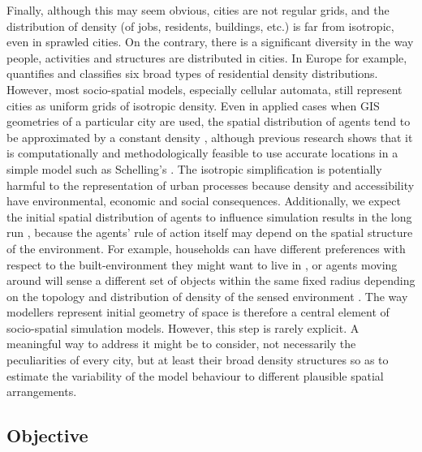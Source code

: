 \documentclass{JASSS}
\begin{document}
Finally, although this may seem obvious, cities are not regular grids, and the distribution of density (of jobs, residents, buildings, etc.) is far from isotropic, even in sprawled cities. On the contrary, there is a significant diversity in the way people, activities and structures are distributed in cities. In Europe for example, \citet{LeNechet2015} quantifies and classifies six broad types of residential density distributions. However, most socio-spatial models, especially cellular automata, still represent cities as uniform grids of isotropic density. Even in applied cases when GIS geometries of a particular city are used, the spatial distribution of agents tend to be approximated by a constant density \citep{arribas2014diverse}, although previous research shows that it is computationally and methodologically feasible to use accurate locations in a simple model such as Schelling's \citep{benenson2002entity}. The isotropic simplification is potentially harmful to the representation of urban processes because density and accessibility have environmental, economic and social consequences. Additionally, we expect the initial spatial distribution of agents to influence simulation results in the long run \citep{Castellanoetal2009}, because the agents' rule of action itself may depend on the spatial structure of the environment. For example, households can have different preferences with respect to the built-environment they might want to live in \citep{SpielmanHarrison2014}, or agents moving around will sense a different set of objects within the same fixed radius depending on the topology \citep{Banos2012} and distribution of density of the sensed environment \citep{LauriJaggi2003, FossettDietrich2009}. The way modellers represent initial geometry of space is therefore a central element of socio-spatial simulation models. However, this step is rarely explicit. A meaningful way to address it might be to consider, not necessarily the peculiarities of every city, but at least their broad density structures so as to estimate the variability of the model behaviour to different plausible spatial arrangements.

\subsection{Objective}

\end{document}
